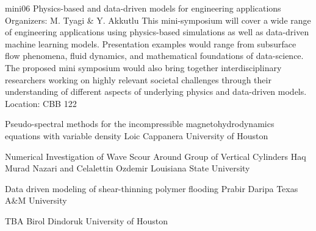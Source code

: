 \mini
{mini06}
{Physics-based and data-driven models for engineering applications}
{Organizers: M. Tyagi \& Y. Akkutlu}
{This mini-symposium will cover a wide range of engineering applications using physics-based simulations as well as data-driven machine learning models. Presentation examples would range from subsurface flow phenomena, fluid dynamics, and mathematical foundations of data-science. The proposed mini symposium would also bring together interdisciplinary researchers working on highly relevant societal challenges through their understanding of different aspects of underlying physics and data-driven models.}
{Location: CBB 122}

\begin{talks}
\item\talk
{Pseudo-spectral methods for the incompressible magnetohydrodynamics equations with variable density}
{Loic Cappanera}
{University of Houston}
\item\talk
{Numerical Investigation of Wave Scour Around Group of Vertical Cylinders }
{Haq Murad Nazari and  Celalettin Ozdemir}
{Louisiana State University}
\item\talk
{Data driven modeling of shear-thinning polymer flooding}
{Prabir Daripa}
{Texas A\&M University}
\item\talk
{TBA}
{Birol Dindoruk}
{University of Houston}
\end{talks}
\room
